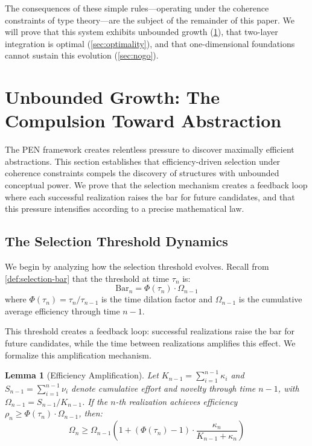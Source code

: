 \documentclass[11pt]{article}
\newtheorem{lemma}[theorem]{Lemma}
\theoremstyle{definition}
\theoremstyle{remark}
\begin{document}
The consequences of these simple rules---operating under the coherence constraints of type theory---are the subject of the remainder of this paper. We will prove that this system exhibits unbounded growth (\cref{sec:unbounded}), that two-layer integration is optimal (\cref{sec:optimality}), and that one-dimensional foundations cannot sustain this evolution (\cref{sec:nogo}).

\section{Unbounded Growth: The Compulsion Toward Abstraction}
\label{sec:unbounded}

The PEN framework creates relentless pressure to discover maximally efficient abstractions. This section establishes that efficiency-driven selection under coherence constraints compels the discovery of structures with unbounded conceptual power. We prove that the selection mechanism creates a feedback loop where each successful realization raises the bar for future candidates, and that this pressure intensifies according to a precise mathematical law.

\subsection{The Selection Threshold Dynamics}

We begin by analyzing how the selection threshold evolves. Recall from \cref{def:selection-bar} that the threshold at time $\tau_n$ is:
\[
\mathrm{Bar}_n = \Phi(\tau_n) \cdot \Omega_{n-1}
\]
where $\Phi(\tau_n) = \tau_n/\tau_{n-1}$ is the time dilation factor and $\Omega_{n-1}$ is the cumulative average efficiency through time $n-1$.

This threshold creates a feedback loop: successful realizations raise the bar for future candidates, while the time between realizations amplifies this effect. We formalize this amplification mechanism.

\begin{lemma}[Efficiency Amplification]
\label{lem:efficiency-amplification}
Let $K_{n-1} = \sum_{i=1}^{n-1} \kappa_i$ and $S_{n-1} = \sum_{i=1}^{n-1} \nu_i$ denote cumulative effort and novelty through time $n-1$, with $\Omega_{n-1} = S_{n-1}/K_{n-1}$. If the $n$-th realization achieves efficiency $\rho_n \geq \Phi(\tau_n) \cdot \Omega_{n-1}$, then:
\[
\Omega_n \geq \Omega_{n-1} \left(1 + (\Phi(\tau_n) - 1) \cdot \frac{\kappa_n}{K_{n-1} + \kappa_n}\right)
\]
\end{lemma}
\end{document}

